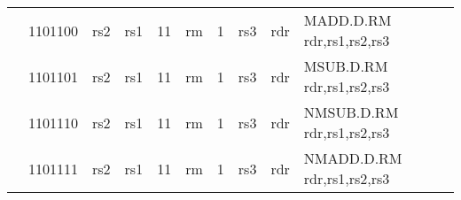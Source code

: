\begin{table}[p]
\begin{small}
\begin{center}
\begin{tabular}{rcccccccccccl}
&
\multicolumn{2}{|c|}{1101100} &
\multicolumn{1}{c|}{rs2} &
\multicolumn{1}{c|}{rs1} &
\multicolumn{1}{c|}{11} &
\multicolumn{2}{c|}{rm} &
\multicolumn{1}{c|}{1} &
\multicolumn{2}{c|}{rs3} &
\multicolumn{1}{c|}{rdr} & MADD.D.RM rdr,rs1,rs2,rs3 \\
\cline{2-12}
  

&
\multicolumn{2}{|c|}{1101101} &
\multicolumn{1}{c|}{rs2} &
\multicolumn{1}{c|}{rs1} &
\multicolumn{1}{c|}{11} &
\multicolumn{2}{c|}{rm} &
\multicolumn{1}{c|}{1} &
\multicolumn{2}{c|}{rs3} &
\multicolumn{1}{c|}{rdr} & MSUB.D.RM rdr,rs1,rs2,rs3 \\
\cline{2-12}
  

&
\multicolumn{2}{|c|}{1101110} &
\multicolumn{1}{c|}{rs2} &
\multicolumn{1}{c|}{rs1} &
\multicolumn{1}{c|}{11} &
\multicolumn{2}{c|}{rm} &
\multicolumn{1}{c|}{1} &
\multicolumn{2}{c|}{rs3} &
\multicolumn{1}{c|}{rdr} & NMSUB.D.RM rdr,rs1,rs2,rs3 \\
\cline{2-12}
  

&
\multicolumn{2}{|c|}{1101111} &
\multicolumn{1}{c|}{rs2} &
\multicolumn{1}{c|}{rs1} &
\multicolumn{1}{c|}{11} &
\multicolumn{2}{c|}{rm} &
\multicolumn{1}{c|}{1} &
\multicolumn{2}{c|}{rs3} &
\multicolumn{1}{c|}{rdr} & NMADD.D.RM rdr,rs1,rs2,rs3 \\
\cline{2-12}
  

\end{tabular}
\end{center}
\end{small}

\label{instr-table}
\end{table}
  

\newpage

